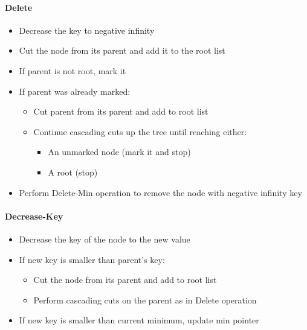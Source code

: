 \paragraph{Delete}
\begin{itemize}
    \item Decrease the key to negative infinity
    \item Cut the node from its parent and add it to the root list
    \item If parent is not root, mark it
    \item If parent was already marked:
        \begin{itemize}
            \item Cut parent from its parent and add to root list
            \item Continue cascading cuts up the tree until reaching either:
                \begin{itemize}
                    \item An unmarked node (mark it and stop)
                    \item A root (stop)
                \end{itemize}
        \end{itemize}
    \item Perform Delete-Min operation to remove the node with negative infinity key
\end{itemize}

\paragraph{Decrease-Key}
\begin{itemize}
    \item Decrease the key of the node to the new value
    \item If new key is smaller than parent's key:
        \begin{itemize}
            \item Cut the node from its parent and add to root list
            \item Perform cascading cuts on the parent as in Delete operation
        \end{itemize}
    \item If new key is smaller than current minimum, update min pointer
\end{itemize}